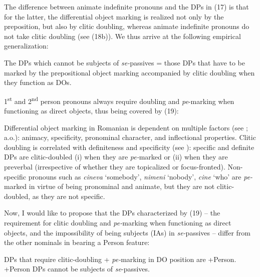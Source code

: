 \documentclass[output=paper]{langsci/langscibook}
\begin{document}
The difference between animate indefinite pronouns and the DPs in (17) is that for the latter, the differential object marking is realized not only by the preposition, but also by clitic doubling, whereas animate indefinite pronouns do not take clitic doubling (see (18b)). We thus arrive at the following empirical generalization:

\ea%
    \label{ex:giurgea:19}
    The DPs which cannot be subjects of \textit{se-}passives = those DPs that have to be marked by the prepositional object marking accompanied by clitic doubling when they function as DOs.
\z

1\textsuperscript{st} and 2\textsuperscript{nd} person pronouns always require doubling and \textit{pe}{}-marking when functioning as direct objects, thus being covered by (19):

\ea%
    \label{ex:giurgea:20}
    \z
\z

Differential object marking in Romanian is dependent on multiple factors (see \citealt{Dobrovie-Sorin1994,Cornilescu2000,Mardale2008,Tigău2010,Tigău2014}; a.o.): animacy, specificity, pronominal character, and inflectional properties. Clitic doubling is correlated with definiteness and specificity (see \citealt{Marchis2013}): specific and definite DPs are clitic-doubled (i) when they are \textit{pe-}marked or (ii) when they are preverbal (irrespective of whether they are topicalized or focus-fronted). Non-specific pronouns such as \textit{cineva} ‘somebody’, \textit{nimeni} ‘nobody’, \textit{cine} ‘who’ are \textit{pe-}marked in virtue of being pronominal and animate, but they are not clitic-doubled, as they are not specific.

Now, I would like to propose that the DPs characterized by (19) – the requirement for clitic doubling and \textit{pe-}marking when functioning as direct objects, and the impossibility of being subjects (IAs) in \textit{se-}passives – differ from the other nominals in bearing a Person feature:

\ea%
    \label{ex:giurgea:21}
    \ea DPs that require clitic-doubling + \textit{pe-}marking in DO position are +Person.
      \ex +Person DPs cannot be subjects of \textit{se}{}-passives.
    \z
\z
\end{document}
